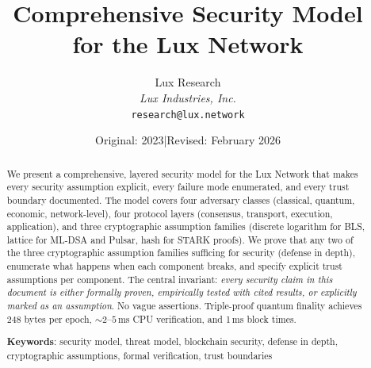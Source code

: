 \documentclass[11pt,a4paper]{article}
\title{\textbf{Comprehensive Security Model\\for the Lux Network}}
\author{
Lux Research \\
\textit{Lux Industries, Inc.}\\
\texttt{research@lux.network}
}
\date{Original: 2023\quad|\quad Revised: February 2026}
\begin{document}
\luxcoverpage

\begin{abstract}
We present a comprehensive, layered security model for the Lux Network that makes
every security assumption explicit, every failure mode enumerated, and every trust
boundary documented. The model covers four adversary classes (classical, quantum,
economic, network-level), four protocol layers (consensus, transport, execution,
application), and three cryptographic assumption families (discrete logarithm for BLS,
lattice for ML-DSA and Pulsar, hash for STARK proofs). We prove that any two of the
three cryptographic assumption families sufficing for security (defense in depth),
enumerate what happens when each component breaks, and specify explicit trust
assumptions per component. The central invariant: \emph{every security claim in this
document is either formally proven, empirically tested with cited results, or
explicitly marked as an assumption}. No vague assertions. Triple-proof quantum finality
achieves 248 bytes per epoch, ${\sim}2$--$5$\,ms CPU verification, and 1\,ms block times.

\textbf{Keywords}: security model, threat model, blockchain security, defense in depth,
cryptographic assumptions, formal verification, trust boundaries
\end{abstract}

\tableofcontents
\newpage













\end{document}

